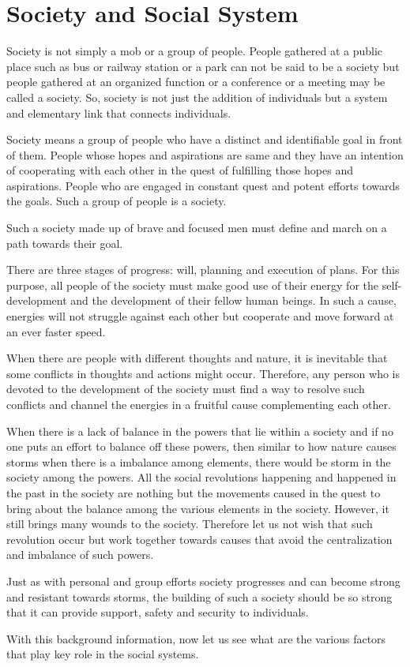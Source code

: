 \chapter{Society and Social System}
Society is not simply a mob or a group of people. People gathered at a public
place such as bus or railway station or a park can not be said to be a society
but people gathered at an organized function or a conference or a meeting may
be called a society. So, society is not just the addition of individuals but a
system and elementary link that connects individuals.  

Society means a group of people who have a distinct and identifiable goal in
front of them. People whose hopes and aspirations are same and they have an
intention of cooperating with each other in the quest of fulfilling those
hopes and aspirations. People who are engaged in constant quest and potent
efforts towards the goals. Such a group of people is a society.

Such a society made up of brave and focused men must define and march on a path
towards their goal.

There are three stages of progress: will, planning and execution of plans. For
this purpose, all people of the society must make good use of their energy for
the self-development and the development of their fellow human beings. In such
a cause, energies will not struggle against each other but cooperate and move
forward at an ever faster speed.

When there are people with different thoughts and nature, it is inevitable that
some conflicts in thoughts and actions might occur. Therefore, any person who
is devoted to the development of the society must find a way to resolve such
conflicts and channel the energies in a fruitful cause complementing each
other. 

When there is a lack of balance in the powers that lie within a society and if
no one puts an effort to balance off these powers, then similar to how nature
causes storms when there is a imbalance among elements, there would be storm
in the society among the powers. All the social revolutions happening and
happened in the past in the society are nothing but the movements caused in the
quest to bring about the balance among the various elements in the society.
However, it still brings many wounds to the society. Therefore let us not wish
that such revolution occur but work together towards causes that avoid the
centralization and imbalance of such powers.

Just as with personal and group efforts society progresses and can become
strong and resistant towards storms, the building of such a society should be
so strong that it can provide support, safety and security to individuals.

With this background information, now let us see what are the various factors
that play key role in the social systems.
